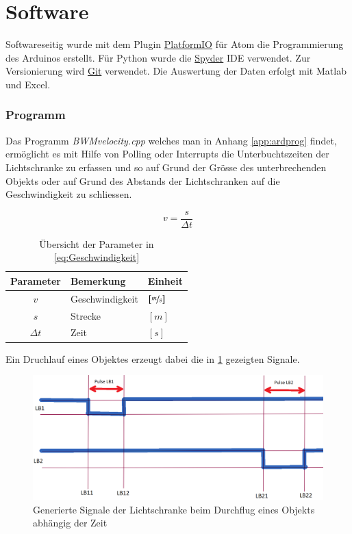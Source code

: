 \part{Software}
Softwareseitig wurde mit dem Plugin \href{https://platformio.org/platformio-ide}{PlatformIO} für Atom die Programmierung des Arduinos erstellt. Für Python wurde die \href{https://www.spyder-ide.org}{Spyder} IDE verwendet. Zur Versionierung wird \href{https://git-scm.com/}{Git} verwendet. Die Auswertung der Daten erfolgt mit Matlab und Excel.
\section{Programm}
Das Programm \textit{BWMvelocity.cpp} welches man in Anhang \ref{app:ardprog} findet, ermöglicht es mit Hilfe von Polling oder Interrupts die Unterbuchtszeiten der Lichtschranke zu erfassen und so auf Grund der Grösse des unterbrechenden Objekts oder auf Grund des Abstands der Lichtschranken auf die Geschwindigkeit zu schliessen.

\begin{equation}\label{eq:Geschwindigkeit}
    v = \frac{s}{\varDelta t}
\end{equation}

\begin{table}[h] 
    \centering
    \begin{tabular}{cll}
        Parameter&Bemerkung&Einheit\\
        \hline
        $v$& Geschwindigkeit&$\left[\nicefrac{m}{s}\right]$\\
        $s$& Strecke&$\left[m\right]$\\
        $ \varDelta t$& Zeit&$\left[s\right]$\\
    \end{tabular}
    \caption{Übersicht der Parameter in \ref{eq:Geschwindigkeit}}
\end{table}

Ein Druchlauf  eines Objektes erzeugt dabei die in \ref{fig:ArdSigs} gezeigten Signale.
\begin{figure}[ht]
    \centering
    \includegraphics[width=\textwidth]{images/signals}
    \caption{Generierte Signale der Lichtschranke beim Durchflug eines Objekts abhängig der Zeit}
    \label{fig:ArdSigs}
\end{figure}


